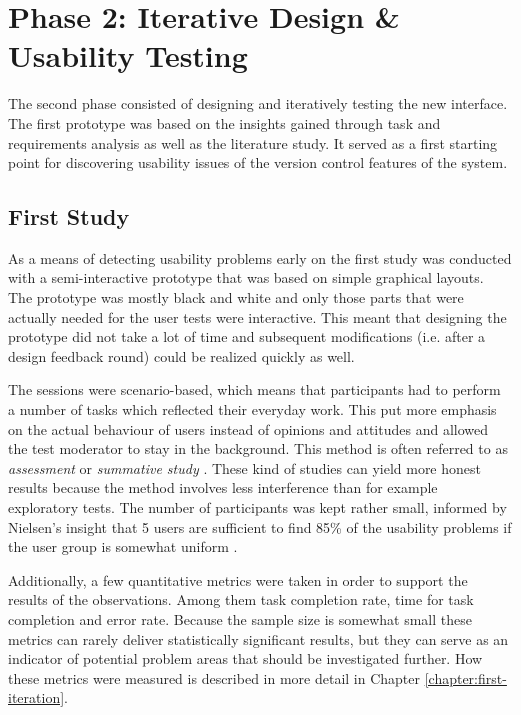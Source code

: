 \section{Phase 2: Iterative Design \& Usability Testing}
The second phase consisted of designing and iteratively testing the new interface. The first prototype was based on the insights gained through task and requirements analysis as well as the literature study. It served as a first starting point for discovering usability issues of the version control features of the system.



\subsection{First Study}
As a means of detecting usability problems early on the first study was conducted with a semi-interactive prototype that was based on simple graphical layouts. The prototype was mostly black and white and only those parts that were actually needed for the user tests were interactive. This meant that designing the prototype did not take a lot of time and subsequent modifications (i.e. after a design feedback round) could be realized quickly as well.

The sessions were scenario-based, which means that participants had to perform a number of tasks which reflected their everyday work. This put more emphasis on the actual behaviour of users instead of opinions and attitudes and allowed the test moderator to stay in the background. This method is often referred to as \textit{assessment} or \textit{summative study} \cite{rubin_handbook_2008,goodman_observing_2012}. These kind of studies can yield more honest results because the method involves less interference than for example exploratory tests. The number of participants was kept rather small, informed by Nielsen's insight that 5 users are sufficient to find 85\% of the usability problems if the user group is somewhat uniform \cite{nielsen_why_2000}.

Additionally, a few quantitative metrics were taken in order to support the results of the observations. Among them task completion rate, time for task completion and error rate. Because the sample size is somewhat small these metrics can rarely deliver statistically significant results, but they can serve as an indicator of potential problem areas that should be investigated further. How these metrics were measured is described in more detail in Chapter \ref{chapter:first-iteration}.

